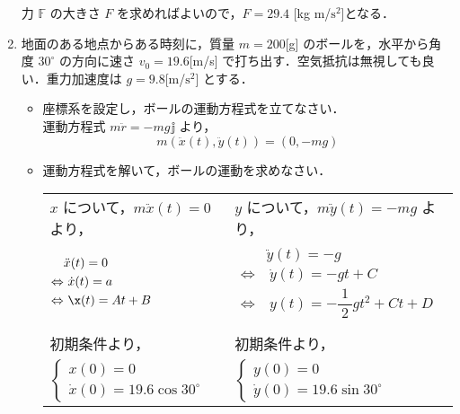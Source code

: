 \documentclass[a4paper,11pt]{ltjsarticle}
\begin{document}
\begin{enumerate}
  力 $\mathbb{F}$ の大きさ $F$ を求めればよいので，$F = 29.4$ [kg \cdot m/$\mathrm{s}^2$]となる．

  \item 地面のある地点からある時刻に，質量 $m=200$[g] のボールを，水平から角度 $30^{\circ}$ の方向に速さ $v_{0} = 19.6$[m/s] で打ち出す．空気抵抗は無視しても良い．重力加速度は $g = 9.8$[m/$\mathrm{s}^{2}$] とする．

  \begin{itemize}
    \item 座標系を設定し，ボールの運動方程式を立てなさい．\\

    運動方程式 $m \ddot{r} = -mg \mathbb{j}$ より，
    \begin{equation*}
      m(\ddot{x}(t),\ddot{y}(t))=(0,-mg)
    \end{equation*}
    \item 運動方程式を解いて，ボールの運動を求めなさい．

    \begin{table}[hb]
      \centering
      \begin{tabular}{l|l}
        $x$ について，$m \ddot{x}(t) = 0$ より， & $y$ について，$m \ddot{y}(t) = -mg$ より， \\
        $
        \begin{aligned}
          &\ddot{x}(t)=0 \\
          \Leftrightarrow &\ \dot{x}(t) = a \\
          \Leftrightarrow &\ \x(t) = At+B
        \end{aligned}
        $
        &
        $
        \begin{aligned}
          &\ddot{y}(t)=-g \\
          \Leftrightarrow &\ \dot{y}(t) = -gt+C \\
          \Leftrightarrow &\ y(t) = - \dfrac{1}{\ 2\ }gt^{2}+Ct+D
        \end{aligned}
        $ \\ \\
        初期条件より， & 初期条件より，\\[11pt]
        $
        \begin{cases}
          x(0)=0 \\
          \dot{x}(0)=19.6 \cos 30^{\circ}
        \end{cases}
        $
        &
        $
        \begin{cases}
          y(0)=0 \\
          \dot{y}(0)=19.6 \sin 30^{\circ}
        \end{cases}
        $
      \end{tabular}
    \end{table}


\end{itemize}
\end{enumerate}
\end{document}
